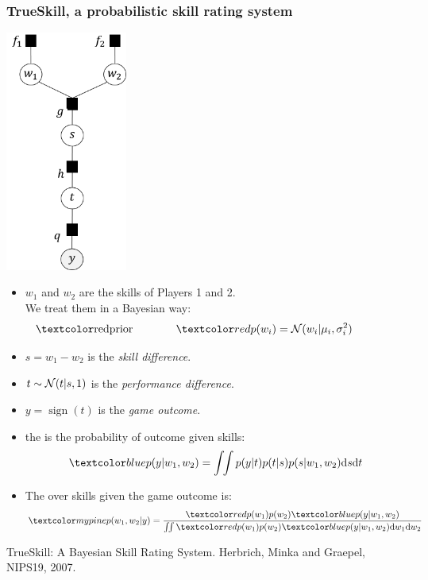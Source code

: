 \begin{frame}
\frametitle{TrueSkill\texttrademark, a probabilistic skill rating system}

\parbox{0.30\textwidth}{
\includegraphics[width=0.3\textwidth]{TrueSkillFactorGraph}
}
\parbox{0.69\textwidth}{
\begin{itemize}
\item $w_1$ and $w_2$ are the skills of Players 1 and 2.\\
We treat them in a Bayesian way:
\[
\textrm{\Red{prior}\;\;\;\;\;\;\;\;\;\;\;\;\;\;}\Red{p(w_i)} = \N(w_i|\mu_i, \sigma_i^2)
\;\;\;\;\;\;\;\;\;\;\;\;\;\; 
\]
\item $s=w_1-w_2$ is the \emph{skill difference}.
\item $t\sim\mathcal{N}(t|s, 1)$ is the \emph{performance difference}.
\item  $y= \operatorname{sign}(t) $ is the \emph{game outcome}.
\item the  is the probability of outcome given skills:
\[
\Blue{p(y|w_1,w_2)} = \int\!\!\int p(y|t)p(t|s)p(s|w_1,w_2)\mathrm{d}s\mathrm{d}t
\]
\item The  over skills given the game outcome is:
\[
\Green{p(w_1,w_2|y)} = \frac{\Red{p(w_1)p(w_2)}\Blue{p(y|w_1,w_2)}}
{\int\!\!\int \Red{p(w_1)p(w_2)}\Blue{p(y|w_1,w_2)}\mathrm{d}w_1\mathrm{d}w_2}
\]
\end{itemize}
}
{\scriptsize TrueSkill\texttrademark: A Bayesian Skill Rating
System. Herbrich, Minka and Graepel, NIPS19, 2007.}
\end{frame}


